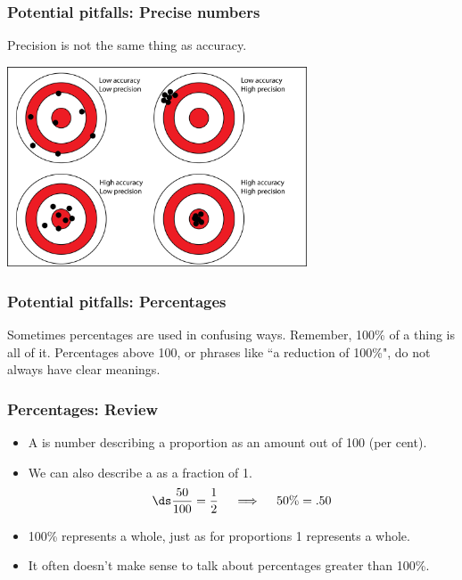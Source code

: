 \documentclass[xcolor=table]{beamer}
\begin{document}
\begin{frame}
\frametitle{Potential pitfalls: Precise numbers}

\begin{block}{}
Precision is not the same thing as accuracy.
\end{block}

\begin{center}
\includegraphics[width=3.5in]{../images/precision_accuracy}
\end{center}
\end{frame}

\begin{frame}
\frametitle{Potential pitfalls: Percentages}

\begin{block}{}
Sometimes percentages are used in confusing ways. Remember, 100\% of a thing is all of it. Percentages above 100, or phrases like ``a reduction of 100\%", do not always have clear meanings. 
\end{block}


\end{frame}

\begin{frame}
\frametitle{Percentages: Review}

\begin{block}{}
\begin{itemize}
\item A  is number describing a proportion as an amount out of 100 (per cent).
\pause
\item We can also describe a  as a fraction of 1.
\[\ds \frac {50}{100} = \frac 1 2 \quad \implies \quad 50\% = .50\]
\pause
\item 100\% represents a whole, just as for proportions 1 represents a whole.
\pause
\item It often doesn't make sense to talk about percentages greater than 100\%.
\end{itemize}
\end{block}
\end{frame}
\end{document}
